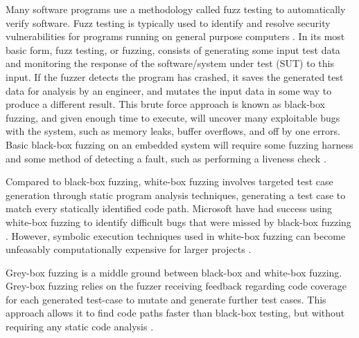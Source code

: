 \documentclass[../report.tex]{subfiles}
\begin{document}


Many software programs use a methodology called fuzz testing to automatically
verify software. Fuzz testing is typically used to identify and resolve
security vulnerabilities for programs running on general purpose computers
\citep{Google_2023}. In its most basic form, fuzz testing, or fuzzing, consists
of generating some input test data and monitoring the response of the
software/system under test (SUT) to this input. If the fuzzer detects the
program has crashed, it saves the generated test data for analysis by an
engineer, and mutates the input data in some way to produce a different result.
This brute force approach is known as black-box fuzzing, and given enough time
to execute, will uncover many exploitable bugs with the system, such as memory
leaks, buffer overflows, and off by one errors. Basic black-box fuzzing on an
embedded system will require some fuzzing harness \citep{Eisele_et_al_2022} and
some method of detecting a fault, such as performing a liveness check
\citep{Yun_2022}.

Compared to black-box fuzzing, white-box fuzzing involves targeted test case
generation through static program analysis techniques, generating a test case
to match every statically identified code path. Microsoft have had success
using white-box fuzzing to identify difficult bugs that were missed by
black-box fuzzing \citep{Godefroid_2012}. However, symbolic execution
techniques used in white-box fuzzing can become unfeasably computationally
expensive for larger projects \citep{Krishnamoorthy_2010}.

Grey-box fuzzing is a middle ground between black-box and white-box fuzzing.
Grey-box fuzzing relies on the fuzzer receiving feedback regarding code
coverage for each generated test-case to mutate and generate further test
cases. This approach allows it to find code paths faster than black-box
testing, but without requiring any static code analysis \citep{Yun_2022}.
\end{document}
